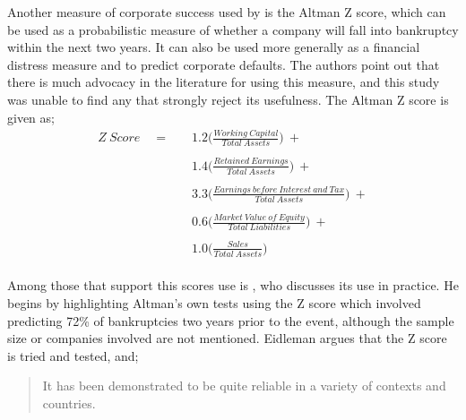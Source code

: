 {Another measure of corporate success used by \cite{moldovan2015learning} is the Altman Z score, which can be used as a probabilistic measure of whether a company will fall into bankruptcy within the next two years. It can also be used more generally as a financial distress measure and to predict corporate defaults. The authors point out that there is much advocacy in the literature for using this measure, and this study was unable to find any that strongly reject its usefulness. The Altman Z score is given as;
\begin {equation}\label{AltmanZScore}
\begin{aligned}
Z \ Score \quad = \quad & 1.2\bigg(\frac{Working \ Capital}{Total \ Assets}\bigg) \ + \\\\
		& 1.4\bigg({\frac{Retained \ Earnings}{Total \ Assets}}\bigg) \ + \\\\
		& 3.3\bigg({\frac{Earnings \ before \ Interest \ and \ Tax}{Total \ Assets}}\bigg) \ + \\\\
		& 0.6\bigg({\frac{Market \ Value \ of \ Equity}{Total \ Liabilities}}\bigg) \ + \\\\
		& 1.0\bigg({\frac{Sales}{Total \ Assets}}\bigg)
\end{aligned}
\end{equation}\\
Among those that support this scores use is \cite {eidleman1995z}, who discusses its use in practice. He begins by highlighting Altman's own tests using the Z score which involved predicting 72\% of bankruptcies two years prior to the event, although the sample size or companies involved are not mentioned. Eidleman argues that the Z score is tried and tested, and;
\begin {quote}
It has been demonstrated to be quite reliable in a variety of contexts and countries. 


\end{quote}}
